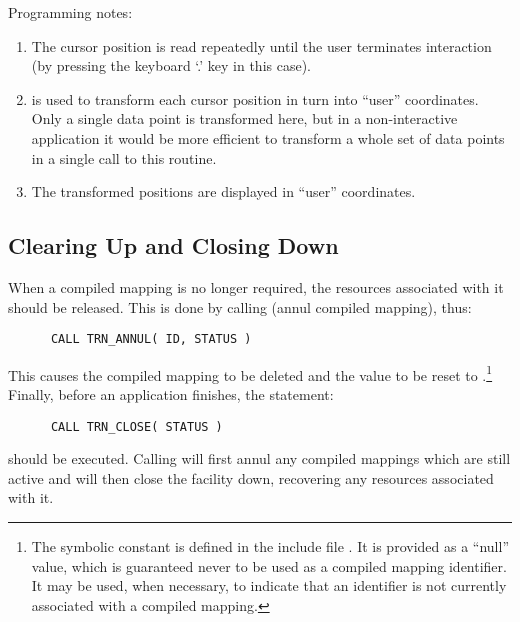 Programming notes:

\begin{enumerate}

\item The  cursor position is read repeatedly until the user
terminates interaction (by pressing the keyboard `.' key in this case). 

\item {} is used to transform each cursor position in turn
into ``user'' coordinates. 
Only a single data point is transformed here, but in a non-interactive
application it would be more efficient to transform a whole set of data
points in a single call to this routine. 

\item The transformed positions are displayed in ``user'' coordinates.

\end{enumerate}
\exampledone


\subsection{Clearing Up and Closing Down}

\label{section:simple:cleanup}

When a compiled mapping is no longer required, the resources associated with
it should be released. 
This is done by calling  (annul compiled mapping), thus:

\begin{verbatim}
      CALL TRN_ANNUL( ID, STATUS )
\end{verbatim}

This causes the compiled mapping to be deleted and the  value
to be reset to .\footnote{ 
The symbolic constant  is defined in the include file 
.
It is provided as a ``null'' value, which is guaranteed never to be used as
a compiled mapping identifier. 
It may be used, when necessary, to indicate that an identifier is not
currently associated with a compiled mapping.} 
Finally, before an application finishes, the statement: 

\begin{verbatim}
      CALL TRN_CLOSE( STATUS )
\end{verbatim}

should be executed.
Calling  will first annul any compiled mappings which are
still active and will then close the  facility down,
recovering any resources associated with it. 

